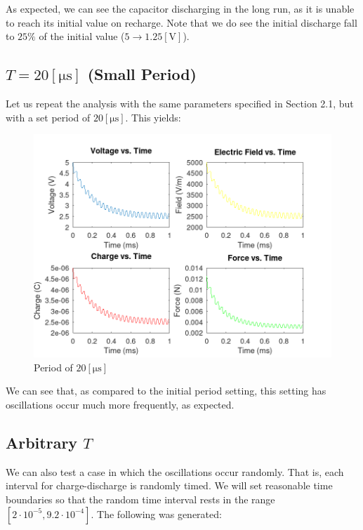 As expected, we can see the capacitor discharging in the long run, as it is unable to reach its initial value on recharge. Note that we do see the initial discharge fall to $25\%$ of the initial value ($5\to1.25[\si{\volt}]$).

\subsection{$T=20[\si{\micro\second}]$ (Small Period)}

Let us repeat the analysis with the same parameters specified in Section 2.1, but with a set period of $20[\si{\micro\second}]$. This yields:

\begin{figure}[H]
  \centering
  \includegraphics[width=.9\textwidth]{Figures/T20.png}
  \caption{Period of $20[\si{\micro\second}]$}
  \label{fig:3}
\end{figure}

We can see that, as compared to the initial period setting, this setting has oscillations occur much more frequently, as expected.

\subsection{Arbitrary $T$}

We can also test a case in which the oscillations occur randomly. That is, each interval for charge-discharge is randomly timed. We will set reasonable time boundaries so that the random time interval rests in the range $[2\cdot10^{-5},9.2\cdot10^{-4}]$. The following was generated:

